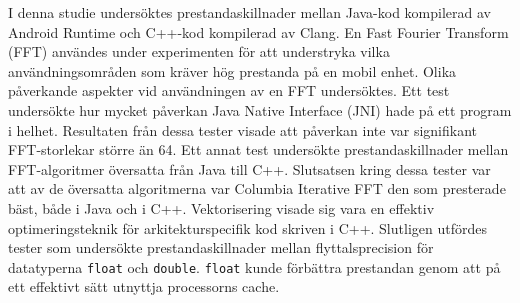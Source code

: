 I denna studie undersöktes prestandaskillnader mellan Java-kod kompilerad av Android Runtime och C++-kod kompilerad av Clang. En Fast Fourier Transform (FFT) användes under experimenten för att understryka vilka användningsområden som kräver hög prestanda på en mobil enhet. Olika påverkande aspekter vid användningen av en FFT undersöktes. Ett test undersökte hur mycket påverkan Java Native Interface (JNI) hade på ett program i helhet. Resultaten från dessa tester visade att påverkan inte var signifikant FFT-storlekar större än 64. Ett annat test undersökte prestandaskillnader mellan FFT-algoritmer översatta från Java till C++. Slutsatsen kring dessa tester var att av de översatta algoritmerna var Columbia Iterative FFT den som presterade bäst, både i Java och i C++. Vektorisering visade sig vara en effektiv optimeringsteknik för arkitekturspecifik kod skriven i C++. Slutligen utfördes tester som undersökte prestandaskillnader mellan flyttalsprecision för datatyperna \texttt{float} och \texttt{double}. \texttt{float} kunde förbättra prestandan genom att på ett effektivt sätt utnyttja processorns cache.
